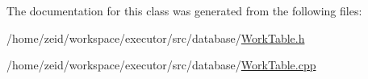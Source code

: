 The documentation for this class was generated from the following files:\begin{DoxyCompactItemize}
\item 
/home/zeid/workspace/executor/src/database/\hyperlink{_work_table_8h}{WorkTable.h}\item 
/home/zeid/workspace/executor/src/database/\hyperlink{_work_table_8cpp}{WorkTable.cpp}\end{DoxyCompactItemize}
